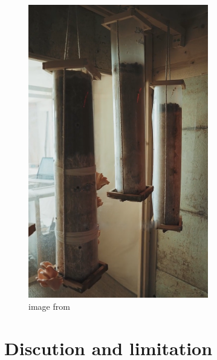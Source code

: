 \begin{figure}[h]
    \centering
    \includegraphics[width=0.7\textwidth]{images/lowtechdouche2.png}
    \caption{image from \cite{lowtechmyco}}
    \label{fig:blasttrash}
\end{figure} 


\section{Discution and limitation}

